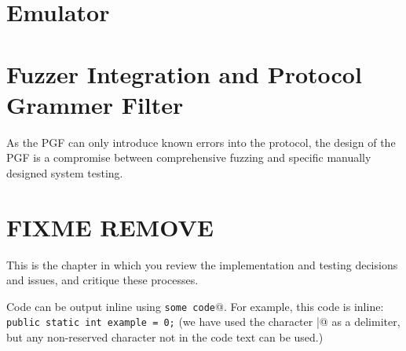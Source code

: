 \documentclass[../report.tex]{subfiles}
\begin{document}




\section{Emulator}





\section{Fuzzer Integration and Protocol Grammer Filter}


As the PGF can only introduce known errors into the protocol, the design of the
PGF is a compromise between comprehensive fuzzing and specific manually
designed system testing.


\section{FIXME REMOVE}
This is the chapter in which you review the implementation and testing decisions and issues, and critique these processes.

Code can be output inline using \verb@\lstinline|some code|@.  For example, this code is inline: \lstinline|public static int example = 0;| (we have used the character \verb@|@ as a delimiter, but any non-reserved character not in the code text can be used.)
\end{document}
